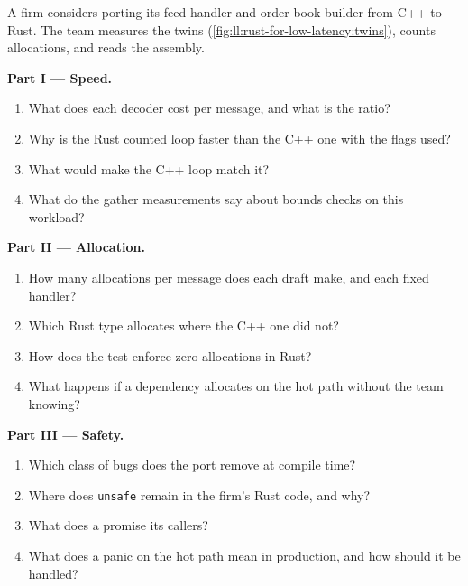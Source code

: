 \begin{problem}\label{pb:ll:rust-for-low-latency:1}
A firm considers porting its feed handler and order-book builder from C++ to Rust. The team measures the twins
(\cref{fig:ll:rust-for-low-latency:twins}), counts allocations, and reads the assembly.

\medskip\noindent\textbf{Part I --- Speed.}
\begin{enumerate}
\item What does each decoder cost per message, and what is the ratio?
\item Why is the Rust counted loop faster than the C++ one with the flags used?
\item What would make the C++ loop match it?
\item What do the gather measurements say about bounds checks on this workload?
\end{enumerate}

\medskip\noindent\textbf{Part II --- Allocation.}
\begin{enumerate}[resume]
\item How many allocations per message does each draft make, and each fixed handler?
\item Which Rust type allocates where the C++ one did not?
\item How does the test enforce zero allocations in Rust?
\item What happens if a dependency allocates on the hot path without the team knowing?
\end{enumerate}

\medskip\noindent\textbf{Part III --- Safety.}
\begin{enumerate}[resume]
\item Which class of bugs does the port remove at compile time?
\item Where does \texttt{unsafe} remain in the firm's Rust code, and why?
\item What does a  promise its callers?
\item What does a panic on the hot path mean in production, and how should it be handled?
\end{enumerate}


\end{problem}
